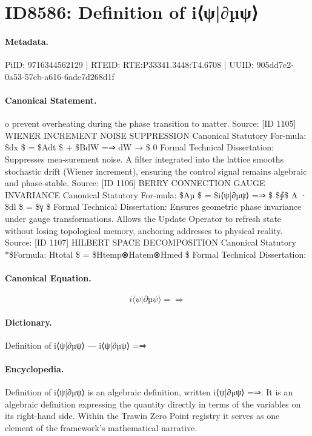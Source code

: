 \section*{ID8586: Definition of i⟨ψ|∂µψ⟩}
\paragraph{Metadata.}
PiID: 9716344562129 | RTEID: RTE:P33341.3448:T4.6708 | UUID: 905dd7e2-0a53-57eb-a616-6adc7d268d1f

\paragraph{Canonical Statement.}
o prevent overheating during the phase transition to matter. Source: [ID 1105] WIENER INCREMENT NOISE SUPPRESSION Canonical Statutory For-mula: \$dx \$ = \$Adt \$ + \$BdW =⇒ dW → \$ 0 Formal Technical Dissertation: Suppresses mea-surement noise. A filter integrated into the lattice smooths stochastic drift (Wiener increment), ensuring the control signal remains algebraic and phase-stable. Source: [ID 1106] BERRY CONNECTION GAUGE INVARIANCE Canonical Statutory For-mula: \$Aµ \$ = \$i⟨ψ|∂µψ⟩ =⇒ \$ \$∮\$ A · \$dl \$ = \$γ \$ Formal Technical Dissertation: Ensures geometric phase invariance under gauge transformations. Allows the Update Operator to refresh state without losing topological memory, anchoring addresses to physical reality. Source: [ID 1107] HILBERT SPACE DECOMPOSITION Canonical Statutory *\$Formula: Htotal \$ = \$Htemp⊗Hatem⊗Hmed \$ Formal Technical Dissertation:

\paragraph{Canonical Equation.}
\[
i⟨ψ|∂µψ⟩ =⇒
\]

\paragraph{Dictionary.}
Definition of i⟨ψ|∂µψ⟩ — i⟨ψ|∂µψ⟩ =⇒

\paragraph{Encyclopedia.}
Definition of i⟨ψ|∂µψ⟩ is an algebraic definition, written i⟨ψ|∂µψ⟩ =⇒. It is an algebraic definition expressing the quantity directly in terms of the variables on its right-hand side. Within the Trawin Zero Point registry it serves as one element of the framework's mathematical narrative.
